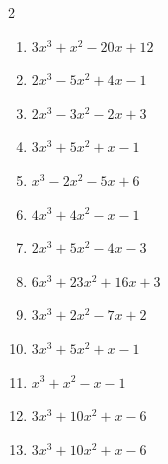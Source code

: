 \begin{multicols}{2}
\begin{enumerate}
        \phantom{$=(2x+1)(3x+1)(x-1)$}

  \item $3x^{3}+x^{2}-20x+12$

        \phantom{$=(3x-2)(x+3)(x-2)$}

  \item $2x^{3}-5x^{2}+4x-1$


  \item $2x^{3}-3x^{2}-2x+3$

        \phantom{$=(2x-3)(x+1)(x-1)$}

\columnbreak %

  \item $3x^{3}+5x^{2}+x-1$


  \item $x^{3}-2x^{2}-5x+6$

        \phantom{$=(x+2)(x-1)(x-3)$}

  \item $4x^{3}+4x^{2}-x-1$

        \phantom{$=(2x+1)(2x-1)(x+1)$}

  \item $2x^{3}+5x^{2}-4x-3$

        \phantom{$=(2x+1)(x+3)(x-1)$}

  \item $6x^{3}+23x^{2}+16x+3$

        \phantom{$=(2x+1)(3x+1)(x+3)$}

\columnbreak %

\resetques

  \item $3x^{3}+2x^{2}-7x+2$

        \phantom{$=(3x-1)(x+2)(x-1)$}

  \item $3x^{3}+5x^{2}+x-1$


  \item $x^{3}+x^{2}-x-1$


  \item $3x^{3}+10x^{2}+x-6$

        \phantom{$=(3x-2)(x+1)(x+3)$}

  \item $3x^{3}+10x^{2}+x-6$


\end{enumerate}
\end{multicols}
